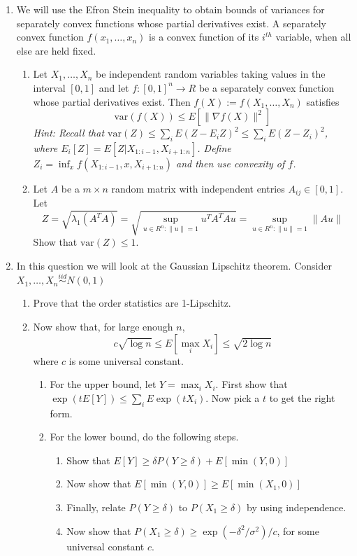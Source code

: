 \documentclass[11pt]{article}
\newcommand{\var}{\text{var}}
\begin{document}
\begin{enumerate}
\item We will use the Efron Stein inequality to obtain bounds of variances for separately convex functions whose partial derivatives exist. A separately convex function $f(x_1,\dots,x_n)$ is a convex function of its $i^{th}$ variable, when all else are held fixed.
\begin{enumerate}
	\item Let $X_1,\dots, X_n$ be independent random variables taking values
in the interval $[0, 1]$ and let $f : [0, 1]^n \rightarrow R$ be a separately convex function whose
partial derivatives exist. Then $f(X):=f(X_1,\dots,X_n)$ satisfies
$$\var(f(X))\leq E[\|\nabla f(X)\|^2]$$
\textit{Hint: Recall that $\var(Z)\leq \sum_i E(Z-E_i Z)^2\leq \sum_i E(Z-Z_i)^2$, where $E_i[Z]=E[Z|X_{1:i-1},X_{i+1:n}]$. Define $Z_i=\inf_{x}f(X_{1:i-1},x,X_{i+1:n})$ and then use convexity of $f$.}
\item Let $A$ be a $m\times n$ random matrix with independent entries $A_{ij}\in[0,1]$. Let 
$$Z=\sqrt{\lambda_1(A^TA)}=\sqrt{\sup_{u\in R^n:\|u\|=1}u^TA^TAu}=\sup_{u\in R^n:\|u\|=1}\|Au\|$$
Show that $\var(Z)\leq 1$.
\end{enumerate}
\item In this question we will look at the Gaussian Lipschitz theorem. Consider $X_1,\dots, X_n\stackrel{iid}{\sim} N(0,1)$
\begin{enumerate}
	\item Prove that the order statistics are 1-Lipschitz.  %
	\item Now show that, for large enough $n$, 
	$$c\sqrt{\log n} \leq E[\max_i X_i]\leq \sqrt{2\log n}$$
where $c$ is some universal constant. 
\begin{enumerate}
	\item For the upper bound, let $Y=\max_i X_i$. First show that $\exp(tE[Y])\leq \sum_i E\exp (tX_i)$. Now pick a $t$ to get the right form.
	\item For the lower bound,  do the following steps.
	\begin{enumerate}
		\item Show that $E[Y]\geq \delta P(Y\geq \delta)+E[\min(Y,0)]$
		\item Now show that $E[\min(Y,0)]\geq E[\min(X_1,0)]$
		\item Finally, relate $P(Y\geq \delta)$ to $P(X_1\geq \delta)$ by using independence.
		\item  Now show that $P(X_1\geq \delta)\geq \exp(-\delta^2/\sigma^2)/c$, for some universal constant $c$.

\end{enumerate}
\end{enumerate}
\end{enumerate}
\end{enumerate}
\end{document}
